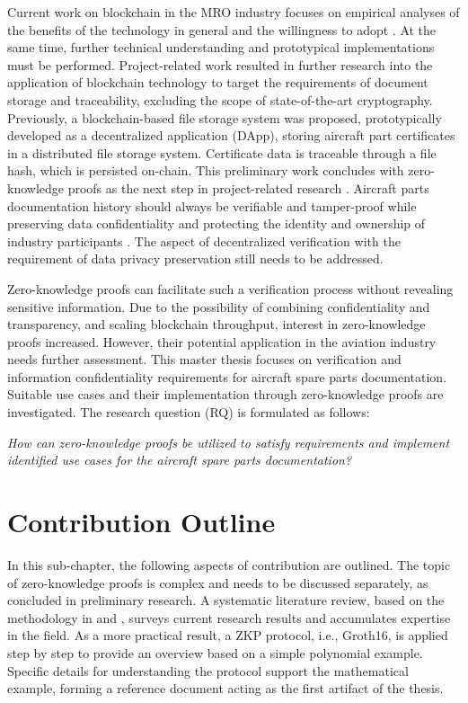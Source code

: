 Current work on blockchain in the MRO industry focuses on empirical analyses of the benefits of the technology in general and the willingness to adopt \citep{efthymiou}. At the same time, further technical understanding and prototypical implementations must be performed. Project-related work resulted in further research into the application of blockchain technology to target the requirements of document storage and traceability, excluding the scope of state-of-the-art cryptography. Previously, a blockchain-based file storage system was proposed, prototypically developed as a decentralized application (DApp), storing aircraft part certificates in a distributed file storage system. Certificate data is traceable through a file hash, which is persisted on-chain. This preliminary work concludes with zero-knowledge proofs as the next step in project-related research \citep{ZedelJ}. Aircraft parts documentation history should always be verifiable and tamper-proof while preserving data confidentiality and protecting the identity and ownership of industry participants \citep{Wickboldt2019BlockchainFW}. The aspect of decentralized verification with the requirement of data privacy preservation still needs to be addressed.

Zero-knowledge proofs can facilitate such a verification process without revealing sensitive information. Due to the possibility of combining confidentiality and transparency, and scaling blockchain throughput, interest in zero-knowledge proofs increased. However, their potential application in the aviation industry needs further assessment. This master thesis focuses on verification and information confidentiality requirements for aircraft spare parts documentation. Suitable use cases and their implementation through zero-knowledge proofs are investigated. The research question (RQ) is formulated as follows:

\begin{center}
\textit{How can zero-knowledge proofs be utilized to satisfy requirements and implement identified use cases for the aircraft spare parts documentation?}  
\end{center}

\section{Contribution Outline}
In this sub-chapter, the following aspects of contribution are outlined. The topic of zero-knowledge proofs is complex and needs to be discussed separately, as concluded in preliminary research. A systematic literature review, based on the methodology in \citet{vomBrockeJan2019TDgs} and \citet{Webster2002AnalyzingTP}, surveys current research results and accumulates expertise in the field. As a more practical result, a ZKP protocol, i.e., Groth16, is applied step by step to provide an overview based on a simple polynomial example. Specific details for understanding the protocol support the mathematical example, forming a reference document acting as the first artifact of the thesis.

